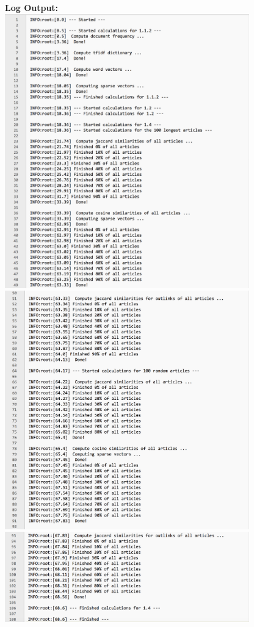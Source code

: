 \documentclass{WeSTassignment}
\begin{document}
\textbf{Log Output:}\\
\includegraphics[width=400px]{log_01}\\
\includegraphics[width=400px]{log_02}\\
\includegraphics[width=400px]{log_03}
\end{document}
